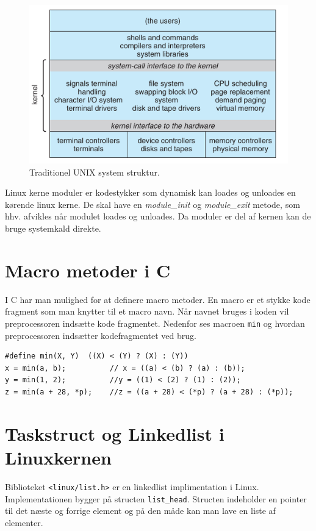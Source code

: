 \documentclass[danish]{report}
\begin{document}
\begin{figure}
\includegraphics[width=\linewidth]{img/kernel.png}
\caption{Traditionel UNIX system struktur.}
\label{fig:unix}
\end{figure}

Linux kerne moduler er kodestykker som dynamisk kan loades og unloades en kørende linux kerne. De skal have en \textit{module\_init} og \textit{module\_exit} metode, som hhv. afvikles når modulet loades og unloades. Da moduler er del af kernen kan de bruge systemkald direkte.

\section{Macro metoder i C}

I C har man mulighed for at definere macro metoder. En macro er et stykke kode fragment som man knytter til et macro navn. Når navnet bruges i koden vil preprocessoren indsætte kode fragmentet. Nedenfor ses macroen \texttt{min} og hvordan preprocessoren indsætter kodefragmentet ved brug.
\begin{lstlisting}
#define min(X, Y)  ((X) < (Y) ? (X) : (Y))
x = min(a, b);          // x = ((a) < (b) ? (a) : (b));
y = min(1, 2);          //y = ((1) < (2) ? (1) : (2));
z = min(a + 28, *p);    //z = ((a + 28) < (*p) ? (a + 28) : (*p));
\end{lstlisting}

\section{Taskstruct og Linkedlist i Linuxkernen}

Biblioteket \texttt{<linux/list.h>} er en linkedlist implimentation i Linux. Implementationen bygger på structen \texttt{list\_head}. Structen indeholder en pointer til det næste og forrige element og på den måde kan man lave en liste af elementer.
\end{document}

